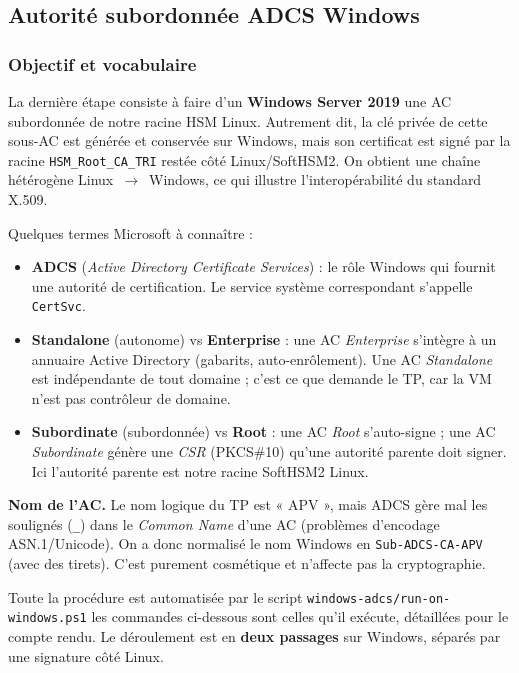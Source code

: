 \documentclass[11pt,a4paper]{article}
\newcommand{\fichier}[1]{\texttt{#1}}
\begin{document}
\subsection{Autorité subordonnée ADCS Windows}
\label{sec:adcs}

\subsubsection{Objectif et vocabulaire}
La dernière étape consiste à faire d'un \textbf{Windows Server 2019} une AC subordonnée
de notre racine HSM Linux. Autrement dit, la clé privée de cette sous-AC est générée et
conservée sur Windows, mais son certificat est signé par la racine
\texttt{HSM\_Root\_CA\_TRI} restée côté Linux/SoftHSM2. On obtient une chaîne hétérogène
Linux~$\rightarrow$~Windows, ce qui illustre l'interopérabilité du standard X.509.

\noindent Quelques termes Microsoft à connaître :
\begin{itemize}[leftmargin=1.4em]
  \item \textbf{ADCS} (\emph{Active Directory Certificate Services}) : le rôle Windows
  qui fournit une autorité de certification. Le service système correspondant s'appelle
  \texttt{CertSvc}.
  \item \textbf{Standalone} (autonome) vs \textbf{Enterprise} : une AC \emph{Enterprise}
  s'intègre à un annuaire Active Directory (gabarits, auto-enrôlement). Une AC
  \emph{Standalone} est indépendante de tout domaine ; c'est ce que demande le TP, car la
  VM n'est pas contrôleur de domaine.
  \item \textbf{Subordinate} (subordonnée) vs \textbf{Root} : une AC \emph{Root} s'auto-signe ;
  une AC \emph{Subordinate} génère une \emph{CSR} (PKCS\#10) qu'une autorité parente doit
  signer. Ici l'autorité parente est notre racine SoftHSM2 Linux.
\end{itemize}

\begin{notebox}
\textbf{Nom de l'AC.} Le nom logique du TP est « APV », mais ADCS gère mal les
soulignés (\texttt{\_}) dans le \emph{Common Name} d'une AC (problèmes d'encodage
ASN.1/Unicode). On a donc normalisé le nom Windows en \texttt{Sub-ADCS-CA-APV} (avec des
tirets). C'est purement cosmétique et n'affecte pas la cryptographie.
\end{notebox}

Toute la procédure est automatisée par le script \fichier{windows-adcs/run-on-windows.ps1} les commandes ci-dessous sont celles qu'il exécute, détaillées pour le
compte rendu. Le déroulement est en \textbf{deux passages} sur Windows, séparés par une
signature côté Linux.
\end{document}
